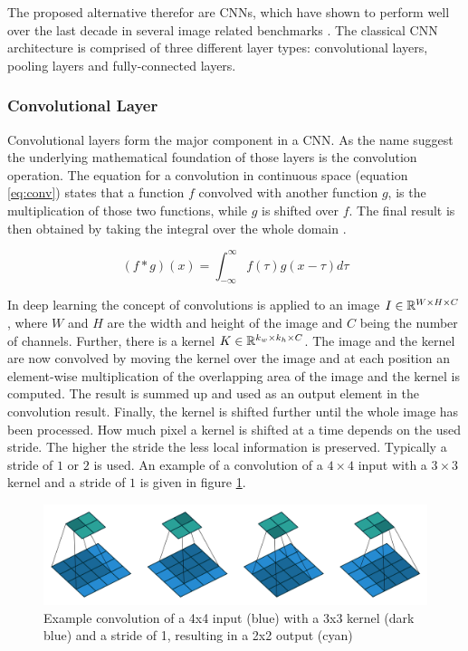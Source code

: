 The proposed alternative therefor are \acfp{CNN}, which have shown to perform well over the last decade in several image related benchmarks \cite{inception} \cite{resnet} \cite{densenet}.
The classical \ac{CNN} architecture is comprised of three different layer types: convolutional layers, pooling layers and fully-connected layers.

\subsubsection{Convolutional Layer}
Convolutional layers form the major component in a \ac{CNN}.
As the name suggest the underlying mathematical foundation of those layers is the convolution operation.
The equation for a convolution in continuous space (equation \ref{eq:conv}) states that a function $f$ convolved with another function $g$, is the multiplication of those two functions, while $g$ is shifted over $f$.
The final result is then obtained by taking the integral over the whole domain \cite{dl}.

\begin{equation}
    (f * g)(x) = \int_{-\infty}^{\infty}f(\tau)g(x - \tau)d\tau
    \label{eq:conv}
\end{equation}

In deep learning the concept of convolutions is applied to an image $I \in \mathbb{R}^{W \times H \times C}$, where $W$ and $H$ are the width and height of the image and $C$ being the number of channels.
Further, there is a kernel $K \in \mathbb{R}^{k_w \times k_h \times C}$.
The image and the kernel are now convolved by moving the kernel over the image and at each position an element-wise multiplication of the overlapping area of the image and the kernel is computed.
The result is summed up and used as an output element in the convolution result.
Finally, the kernel is shifted further until the whole image has been processed.
How much pixel a kernel is shifted at a time depends on the used stride.
The higher the stride the less local information is preserved.
Typically a stride of $1$ or $2$ is used.
An example of a convolution of a $4\times4$ input with a $3\times3$ kernel and a stride of $1$ is given in figure \ref{fig:conv_example}.

\begin{figure}
\begin{center}
    \includegraphics[width=16cm]{imgs/conv/combined.png}
    \caption{Example convolution of a 4x4 input (blue) with a 3x3 kernel (dark blue) and a stride of 1, resulting in a 2x2 output (cyan) \cite{conv_arithmetic}}
    \label{fig:conv_example}
\end{center}
\end{figure}




